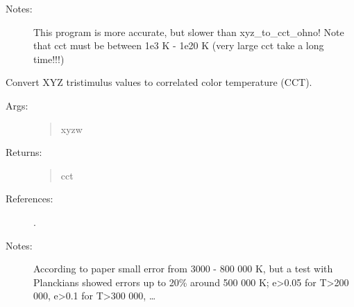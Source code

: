 \documentclass[letterpaper,10pt,english]{sphinxmanual}
\begin{document}
\begin{fulllineitems}
\begin{description}
\begin{quote}
\begin{description}
\end{description}\end{quote}

\item[{Notes:}] \leavevmode
This program is more accurate, but slower than xyz\_to\_cct\_ohno!
Note that cct must be between 1e3 K - 1e20 K 
(very large cct take a long time!!!)

\end{description}

\end{fulllineitems}


\begin{fulllineitems}
\label{\detokenize{color:luxpy.color.cct.xyz_to_cct_HA}}
Convert XYZ tristimulus values to correlated color temperature (CCT).
\begin{description}
\item[{Args:}] \leavevmode\begin{quote}\begin{description}
\item[{xyzw}] \leavevmode
{}

\end{description}\end{quote}

\item[{Returns:}] \leavevmode\begin{quote}\begin{description}
\item[{cct}] \leavevmode
{}

\end{description}\end{quote}

\item[{References:}] . 

\item[{Notes: }] \leavevmode
According to paper small error from 3000 - 800 000 K, but a test with 
Planckians showed errors up to 20\% around 500 000 K; 
e\textgreater{}0.05 for T\textgreater{}200 000, e\textgreater{}0.1 for T\textgreater{}300 000, …

\end{description}

\end{fulllineitems}
\end{document}
